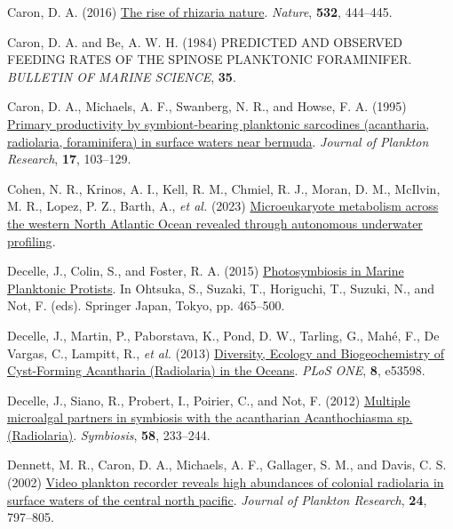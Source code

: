 \documentclass[
]{article}
\newlength{\cslhangindent}
\newenvironment{CSLReferences}[2] %
 {\begin{list}{}{%
  \setlength{\itemindent}{0pt}
  \setlength{\leftmargin}{0pt}
  \setlength{\parsep}{0pt}
  \ifodd #1
   \setlength{\leftmargin}{\cslhangindent}
   \setlength{\itemindent}{-1\cslhangindent}
  \fi
  \setlength{\itemsep}{#2\baselineskip}}}
 {\end{list}}
\begin{document}
\begin{CSLReferences}{1}{0}
Caron, D. A. (2016)
\href{https://www.nature.com/articles/nature17892}{The rise of rhizaria
\textbar{} nature}. \emph{Nature}, \textbf{532}, 444--445.

Caron, D. A. and Be, A. W. H. (1984) PREDICTED AND OBSERVED FEEDING
RATES OF THE SPINOSE PLANKTONIC FORAMINIFER. \emph{BULLETIN OF MARINE
SCIENCE}, \textbf{35}.

Caron, D. A., Michaels, A. F., Swanberg, N. R., and Howse, F. A. (1995)
\href{https://doi.org/10.1093/plankt/17.1.103}{Primary productivity by
symbiont-bearing planktonic sarcodines (acantharia, radiolaria,
foraminifera) in surface waters near bermuda}. \emph{Journal of Plankton
Research}, \textbf{17}, 103--129.

Cohen, N. R., Krinos, A. I., Kell, R. M., Chmiel, R. J., Moran, D. M.,
McIlvin, M. R., Lopez, P. Z., Barth, A., \emph{et al.} (2023)
\href{https://doi.org/10.1101/2023.11.20.567900}{Microeukaryote
metabolism across the western North Atlantic Ocean revealed through
autonomous underwater profiling}.

Decelle, J., Colin, S., and Foster, R. A. (2015)
\href{https://doi.org/10.1007/978-4-431-55130-0_19}{Photosymbiosis in
Marine Planktonic Protists}. In Ohtsuka, S., Suzaki, T., Horiguchi, T.,
Suzuki, N., and Not, F. (eds). Springer Japan, Tokyo, pp. 465--500.

Decelle, J., Martin, P., Paborstava, K., Pond, D. W., Tarling, G., Mahé,
F., De Vargas, C., Lampitt, R., \emph{et al.} (2013)
\href{https://doi.org/10.1371/journal.pone.0053598}{Diversity, Ecology
and Biogeochemistry of Cyst-Forming Acantharia (Radiolaria) in the
Oceans}. \emph{PLoS ONE}, \textbf{8}, e53598.

Decelle, J., Siano, R., Probert, I., Poirier, C., and Not, F. (2012)
\href{https://doi.org/10.1007/s13199-012-0195-x}{Multiple microalgal
partners in symbiosis with the acantharian Acanthochiasma sp.
(Radiolaria)}. \emph{Symbiosis}, \textbf{58}, 233--244.

Dennett, M. R., Caron, D. A., Michaels, A. F., Gallager, S. M., and
Davis, C. S. (2002) \href{https://doi.org/10.1093/plankt/24.8.797}{Video
plankton recorder reveals high abundances of colonial radiolaria in
surface waters of the central north pacific}. \emph{Journal of Plankton
Research}, \textbf{24}, 797--805.


\end{CSLReferences}
\end{document}
